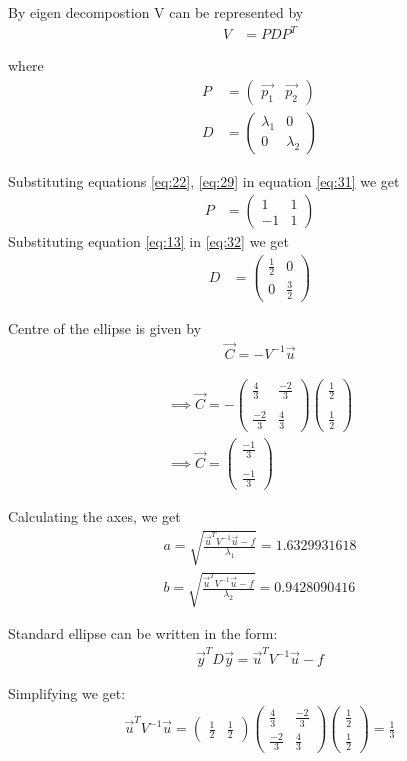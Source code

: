 \documentclass[journal,12pt,twocolumn]{IEEEtran}
\newcommand{\myvec}[1]{\ensuremath{\begin{pmatrix}#1\end{pmatrix}}}
\begin{document}
By eigen decompostion V can be represented by
\begin{align}
    V&=PDP^T
\end{align}

where 
\begin{align}
P&=\myvec{\vec{p_1} & \vec{p_2}}\label{eq:31}\\
D&=\myvec{\lambda_1 & 0 \\0 & \lambda_2}\label{eq:32}
\end{align}

Substituting equations \eqref{eq:22}, \eqref{eq:29} in equation \eqref{eq:31} we get 
\begin{align}
    P&=\myvec{1 & 1 \\-1 & 1}
\end{align}
Substituting equation \eqref{eq:13} in \eqref{eq:32} we get
\begin{align}
       D&=\myvec{\frac{1}{2} & 0\\0 & \frac{3}{2}} \label{eq:34}
\end{align}

Centre of the ellipse is given by 
\begin{align}
    \vec{C}=-V^{-1}\vec{u}
\end{align}

\begin{align}
    \implies\vec{C}=-\myvec{\frac{4}{3}&\frac{-2}{3}\\\\\frac{-2}{3}&\frac{4}{3}}\myvec{\frac{1}{2}\\\\\frac{1}{2}}\\
    \implies\vec{C}=\myvec{\frac{-1}{3}\\\\\frac{-1}{3}}
\end{align}

Calculating the axes, we get
\begin{align}
a=\sqrt{\frac{\vec{u}^TV^{-1}\vec{u}-f}{\lambda_1}}=1.6329931618\\
b=\sqrt{\frac{\vec{u}^TV^{-1}\vec{u}-f}{\lambda_2}}=0.9428090416
\end{align}

Standard ellipse can be written in the form:
\begin{align}
    \vec{y}^TD\vec{y}=\vec{u}^TV^{-1}\vec{u}-f\label{eq:40}
\end{align}

Simplifying we get:
\begin{align}
\vec{u}^TV^{-1}\vec{u}=
\myvec{\frac{1}{2} &\frac{1}{2}}
\myvec{\frac{4}{3} & \frac{-2}{3}\\\frac{-2}{3} & \frac{4}{3}}
\myvec{\frac{1}{2}\\\frac{1}{2}} = \frac{1}{3}\label{eq:41}
\end{align}
\end{document}
